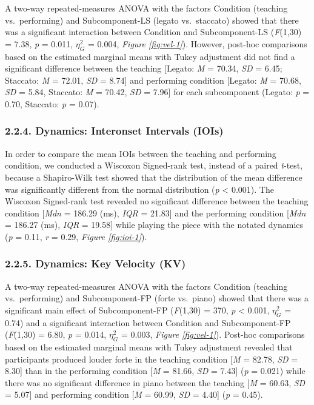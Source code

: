 \documentclass[
  english,
  man,floatsintext]{apa6}
\begin{document}
A two-way repeated-measures ANOVA with the factors Condition (teaching vs.~performing) and Subcomponent-LS (legato vs.~staccato) showed that there was a significant interaction between Condition and Subcomponent-LS (\emph{F}(1,30) = 7.38, \emph{p} = 0.011, \(\eta_G^2\) = 0.004, \emph{Figure \ref{fig:vel-1}}). However, post-hoc comparisons based on the estimated marginal means with Tukey adjustment did not find a significant difference between the teaching {[}Legato: \emph{M} = 70.34, \emph{SD} = 6.45; Staccato: \emph{M} = 72.01, \emph{SD} = 8.74{]} and performing condition {[}Legato: \emph{M} = 70.68, \emph{SD} = 5.84, Staccato: \emph{M} = 70.42, \emph{SD} = 7.96{]} for each subcomponent (Legato: \emph{p} = 0.70, Staccato: \emph{p} = 0.07).

\hypertarget{dynamics-interonset-intervals-iois}{%
\subsubsection{2.2.4. Dynamics: Interonset Intervals (IOIs)}\label{dynamics-interonset-intervals-iois}}

In order to compare the mean IOIs between the teaching and performing condition, we conducted a Wiscoxon Signed-rank test, instead of a paired \emph{t}-test, because a Shapiro-Wilk test showed that the distribution of the mean difference was significantly different from the normal distribution (\emph{p} \textless{} 0.001). The Wiscoxon Signed-rank test revealed no significant difference between the teaching condition {[}\emph{Mdn} = 186.29 (ms), \emph{IQR} = 21.83{]} and the performing condition {[}\emph{Mdn} = 186.27 (ms), \emph{IQR} = 19.58{]} while playing the piece with the notated dynamics (\emph{p} = 0.11, \emph{r} = 0.29, \emph{Figure \ref{fig:ioi-1}}).

\hypertarget{dynamics-key-velocity-kv}{%
\subsubsection{2.2.5. Dynamics: Key Velocity (KV)}\label{dynamics-key-velocity-kv}}

A two-way repeated-measures ANOVA with the factors Condition (teaching vs.~performing) and Subcomponent-FP (forte vs.~piano) showed that there was a significant main effect of Subcomponent-FP (\emph{F}(1,30) = 370, \emph{p} \textless{} 0.001, \(\eta_G^2\) = 0.74) and a significant interaction between Condition and Subcomponent-FP (\emph{F}(1,30) = 6.80, \emph{p} = 0.014, \(\eta_G^2\) = 0.003, \emph{Figure \ref{fig:vel-1}}). Post-hoc comparisons based on the estimated marginal means with Tukey adjustment revealed that participants produced louder forte in the teaching condition {[}\emph{M} = 82.78, \emph{SD} = 8.30{]} than in the performing condition {[}\emph{M} = 81.66, \emph{SD} = 7.43{]} (\emph{p} = 0.021) while there was no significant difference in piano between the teaching {[}\emph{M} = 60.63, \emph{SD} = 5.07{]} and performing condition {[}\emph{M} = 60.99, \emph{SD} = 4.40{]} (\emph{p} = 0.45).
\end{document}
